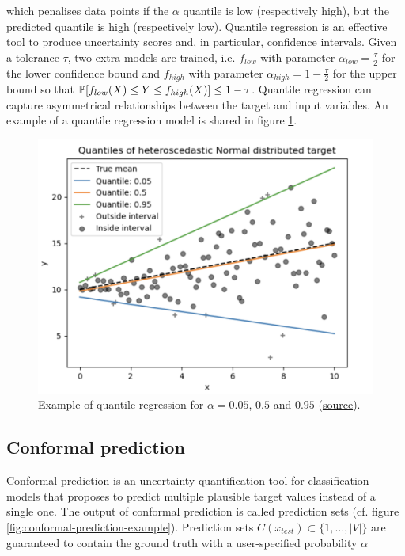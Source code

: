 which penalises data points if the $\alpha$ quantile is low (respectively high), but the predicted quantile is high (respectively low). Quantile regression is an effective tool to produce uncertainty scores and, in particular, confidence intervals. Given a tolerance $\tau$, two extra models are trained, i.e. $f_{low}$ with parameter $\alpha_{low} = \frac{\tau}{2}$ for the lower confidence bound and $f_{high}$ with parameter $\alpha_{high} = 1-\frac{\tau}{2}$ for the upper bound so that $\operatorname{\mathbb{P}}[ f_{low}(X) \leq Y \leq f_{high}(X)] \leq 1-\tau$. Quantile regression can capture asymmetrical relationships between the target and input variables. An example of a quantile regression model is shared in figure \ref{fig:quantile-regression}.



\begin{figure}[!ht]
    \centering
    \includegraphics[scale=0.45]{figures/related_work/quantile_regression.png}
    \caption{Example of quantile regression for $\alpha = 0.05$, $0.5$ and $0.95$ (\href{https://scikit-learn.org/stable/auto_examples/linear_model/plot_quantile_regression.html}{source}).}
    \label{fig:quantile-regression}
\end{figure}


\subsection{Conformal prediction} \label{model:conformal-prediction}

Conformal prediction\cite{conformalPredictions2021} is an uncertainty quantification tool for classification models that proposes to predict multiple plausible target values instead of a single one. The output of conformal prediction is called prediction sets (cf. figure \ref{fig:conformal-prediction-example}). Prediction sets $C(x_{test}) \subset \{1,\ldots, |V|\}$ are guaranteed to contain the ground truth with a user-specified probability $\alpha$

